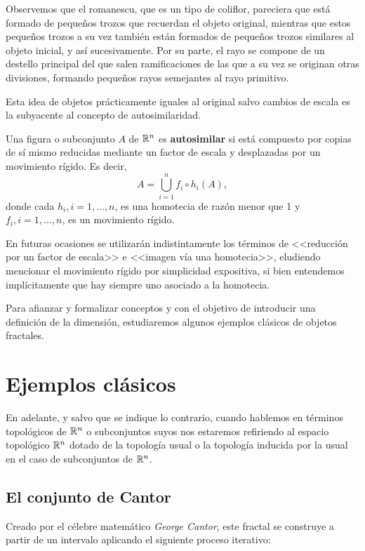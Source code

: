 Observemos que el romanescu, que es un tipo de coliflor, pareciera que está formado de pequeños trozos que recuerdan el objeto original, mientras que estos pequeños trozos a su vez también están formados de pequeños trozos similares al objeto inicial, y así sucesivamente. Por su parte, el rayo se compone de un destello principal del que salen ramificaciones de las que a su vez se originan otras divisiones, formando pequeños rayos semejantes al rayo primitivo.

Esta idea de objetos prácticamente iguales al original salvo cambios de escala es la subyacente al concepto de autosimilaridad.

\begin{definicion}[Autosimilaridad] 
\label{def:autosimilaridad}  
Una figura o subconjunto $A$ de $\mathbb{R}^n$ es \textbf{autosimilar} si está compuesto por copias de sí mismo reducidas mediante un factor de escala y desplazadas por un movimiento rígido. Es decir,
$$
A = \bigcup_{i=1}^n f_i\circ h_i(A),
$$
donde cada $h_i, i=1,\dots,n$, es una homotecia de razón menor que 1 y $f_i, i=1,\dots,n$, es un movimiento rígido. 
\end{definicion}

En futuras ocasiones se utilizarán indistintamente los términos de <<reducción por un factor de escala>> e <<imagen vía una homotecia>>, eludiendo mencionar el movimiento rígido por simplicidad expositiva, si bien entendemos implícitamente que hay siempre uno asociado a la homotecia.

Para afianzar y formalizar conceptos y con el objetivo de introducir una definición de la dimensión, estudiaremos algunos ejemplos clásicos de objetos fractales.

\section{Ejemplos clásicos}
\label{section:ejemplos}

En adelante, y salvo que se indique lo contrario, cuando hablemos en términos topológicos de $\mathbb{R}^n$ o subconjuntos suyos nos estaremos refiriendo al espacio topológico $\mathbb{R}^n$ dotado de la topología usual o la topología inducida por la usual en el caso de subconjuntos de $\mathbb{R}^n$.

\subsection{El conjunto de Cantor}
\label{subsection:Cantor}

Creado por el célebre matemático \textit{George Cantor}, este fractal se construye a partir de un intervalo aplicando el siguiente proceso iterativo:

